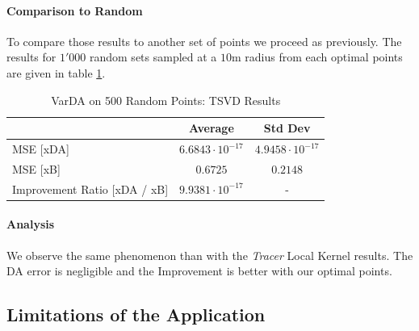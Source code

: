 \paragraph{Comparison to Random}

To compare those results to another set of points we proceed as previously. The results for $1'000$ random sets sampled at a $10$m radius from each optimal points are given in table \ref{tab:TSVD:random}. 
 \\


\begin{table}[h]
\centering
\begin{tabular}{l|cc}
\toprule
               & Average & Std Dev \\ \midrule
MSE [xDA]       & $6.6843 \cdot 10^{-17}$  & $4.9458 \cdot 10^{-17}$  \\
MSE [xB]  & $0.6725$  & $0.2148$  \\
Improvement Ratio  [xDA / xB]  & $9.9381 \cdot 10^{-17}$  & - \\ \bottomrule
\end{tabular}
    \caption{VarDA on 500 Random Points: TSVD Results}
    \label{tab:TSVD:random}
\end{table}

\paragraph{Analysis}

We observe the same phenomenon than with the \textit{Tracer} Local Kernel results. The DA error is negligible and the Improvement is better with our optimal points. 


%
%
%
%




\subsection{Limitations of the Application}

